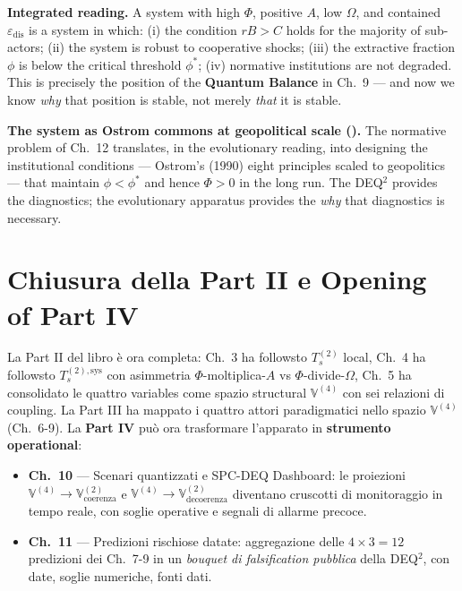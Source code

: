 \Proved{} \textbf{Integrated reading.} A system with high \(\Phi\),
positive \(A\), low \(\Omega\), and contained \(\varepsilon_{\text{dis}}\)
is a system in which: (i) the condition \(rB > C\) holds for the majority
of sub-actors; (ii) the system is robust to cooperative shocks; (iii) the
extractive fraction \(\phi\) is below the critical threshold \(\phi^*\);
(iv) normative institutions are not degraded. This is precisely the
position of the \textbf{Quantum Balance} in Ch.~9 --- and now we know
\emph{why} that position is stable, not merely \emph{that} it is stable.

\Hypoth{} \textbf{The system as Ostrom commons at geopolitical scale
(\Hypoth{}).} The normative problem of Ch.~12 translates, in the
evolutionary reading, into designing the institutional conditions ---
Ostrom's (1990) eight principles scaled to geopolitics --- that maintain
\(\phi < \phi^*\) and hence \(\Phi > 0\) in the long run. The DEQ$^2$
provides the diagnostics; the evolutionary apparatus provides the
\emph{why} that diagnostics is necessary.



\section{Chiusura della Part II e Opening of Part
IV}\label{chiusura-della-parte-ii-e-apertura-della-parte-iv}

La Part II del libro è ora completa: Ch.~3 ha followsto \(T_s^{(2)}\)
local, Ch.~4 ha followsto \(T_s^{(2),\text{sys}}\) con asimmetria
\(\Phi\)-moltiplica-\(A\) vs \(\Phi\)-divide-\(\Omega\), Ch.~5 ha
consolidato le quattro variables come spazio structural
\(\mathbb{V}^{(4)}\) con sei relazioni di coupling. La Part III ha
mappato i quattro attori paradigmatici nello spazio \(\mathbb{V}^{(4)}\)
(Ch.~6-9). La \textbf{Part IV} può ora trasformare l'apparato in
\textbf{strumento operational}:

\begin{itemize}
\tightlist
\item
  \textbf{Ch.~10} --- Scenari quantizzati e SPC-DEQ Dashboard: le
  proiezioni \(\mathbb{V}^{(4)} \to \mathbb{V}^{(2)}_{\text{coerenza}}\)
  e \(\mathbb{V}^{(4)} \to \mathbb{V}^{(2)}_{\text{decoerenza}}\)
  diventano cruscotti di monitoraggio in tempo reale, con soglie
  operative e segnali di allarme precoce.
\item
  \textbf{Ch.~11} --- Predizioni rischiose datate: aggregazione delle
  \(4 \times 3 = 12\) predizioni dei Ch.~7-9 in un \emph{bouquet di
  falsification pubblica} della DEQ$^2$, con date, soglie numeriche, fonti
  dati.
\end{itemize}


